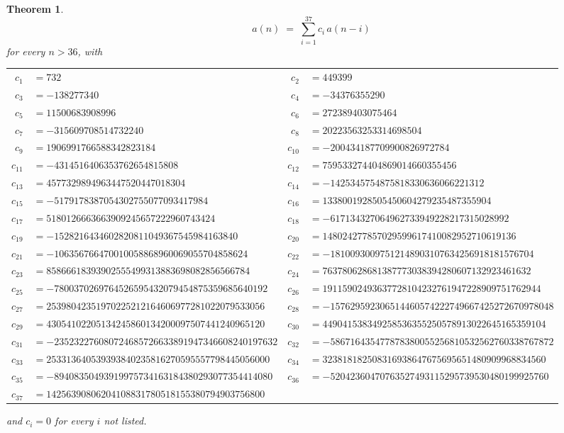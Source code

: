 \documentclass[11pt,a4paper]{article}
\theoremstyle{plain}
\newtheorem{theorem}{Theorem}
\theoremstyle{definition}
\begin{document}
\begin{theorem}
\[
a(n)\;=\;\sum_{i=1}^{37}c_i\,a(n-i)
\]
for every $n>36$, with
\begin{center}\footnotesize
\begin{tabular}{r@{\,}l@{\qquad}r@{\,}l}
$c_{1}$ & $=732$ & $c_{2}$ & $=449399$ \\
$c_{3}$ & $=-138277340$ & $c_{4}$ & $=-34376355290$ \\
$c_{5}$ & $=11500683908996$ & $c_{6}$ & $=272389403075464$ \\
$c_{7}$ & $=-315609708514732240$ & $c_{8}$ & $=20223563253314698504$ \\
$c_{9}$ & $=1906991766588342823184$ & $c_{10}$ & $=-200434187709900826972784$ \\
$c_{11}$ & $=-4314516406353762654815808$ & $c_{12}$ & $=759533274404869014660355456$ \\
$c_{13}$ & $=4577329894963447520447018304$ & $c_{14}$ & $=-1425345754875818330636066221312$ \\
$c_{15}$ & $=-5179178387054302755077093417984$ & $c_{16}$ & $=1338001928505450604279235487355904$ \\
$c_{17}$ & $=5180126663663909245657222960743424$ & $c_{18}$ & $=-617134327064962733949228217315028992$ \\
$c_{19}$ & $=-1528216434602820811049367545984163840$ & $c_{20}$ & $=148024277857029599617410082952710619136$ \\
$c_{21}$ & $=-106356766470010058868960069055704858624$ & $c_{22}$ & $=-18100930097512148903107634256918181576704$ \\
$c_{23}$ & $=85866618393902555499313883698082856566784$ & $c_{24}$ & $=763780628681387773038394280607132923461632$ \\
$c_{25}$ & $=-7800370269764526595432079454875359685640192$ & $c_{26}$ & $=19115902493637728104232761947228909751762944$ \\
$c_{27}$ & $=25398042351970225212164606977281022079533056$ & $c_{28}$ & $=-157629592306514460574222749667425272670978048$ \\
$c_{29}$ & $=43054102205134245860134200097507441240965120$ & $c_{30}$ & $=449041538349258536355250578913022645165359104$ \\
$c_{31}$ & $=-235232276080724685726633891947346608240197632$ & $c_{32}$ & $=-586716435477878380055256810532562760338767872$ \\
$c_{33}$ & $=253313640539393840235816270595557798445056000$ & $c_{34}$ & $=323818182508316938647675695651480909968834560$ \\
$c_{35}$ & $=-89408350493919975734163184380293077354414080$ & $c_{36}$ & $=-52042360470763527493115295739530480199925760$ \\
$c_{37}$ & $=14256390806204108831780518155380794903756800$ \\
\end{tabular}
\end{center}
and $c_i=0$ for every $i$ not listed.
\end{theorem}
\end{document}
